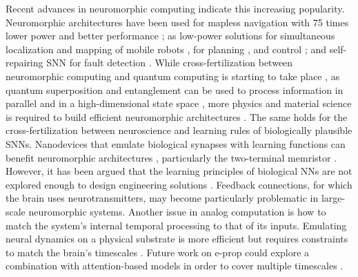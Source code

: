     Recent advances in neuromorphic computing indicate this increasing popularity.
    Neuromorphic architectures have been used for mapless navigation with 75 times lower power and better performance \citep{tang2020reinforcement}; as low-power solutions for simultaneous localization and mapping of mobile robots \citep{tang2019spiking}, for planning \citep{fischl2017path}, and control \citep{blum2017neuromorphic}; and self-repairing SNN for fault detection \citep{zhu2017target}.
    While cross-fertilization between neuromorphic computing and quantum computing is starting to take place \citep{russek2016stochastic}, as quantum superposition and entanglement can be used to process information in parallel and in a high-dimensional state space \citep{fujii2017harnessing, yamamoto2017coherent,tacchino2019artificial}, more physics and material science is required to build efficient neuromorphic architectures \citep{markovic2020physics}.
    The same holds for the cross-fertilization between neuroscience and learning rules of biologically plausible SNNs.
    Nanodevices that emulate biological synapses with learning functions can benefit neuromorphic architectures \citep{yao2017face,wang2018photonic,ren2018analytical}, particularly the two-terminal memristor \citep{jo2010nanoscale,wang2017memristors}.
    However, it has been argued that the learning principles of biological NNs are not explored enough to design engineering solutions \citep{gorban2019unreasonable,taherkhani2018supervised}.
    Feedback connections, for which the brain uses neurotransmitters, may become particularly problematic in large-scale neuromorphic systems.
    Another issue in analog computation is how to match the system's internal temporal processing to that of its inputs.
    Emulating neural dynamics on a physical substrate is more efficient but requires constraints to match the brain's timescales \citep{mead1990neuromorphic,jaeger2021dimensions}.
    Future work on e-prop could explore a combination with attention-based models in order to cover multiple timescales \citep{bellec2020solution}.
